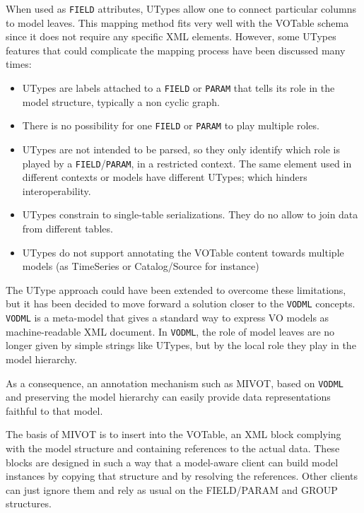 When used as \texttt{FIELD} attributes, UTypes allow one to connect particular columns to model leaves. This mapping method fits very well with the VOTable schema since it does not require any specific XML elements. 
However, some UTypes features that could complicate the mapping process have been discussed many times:

\begin{itemize}
  \item UTypes are labels attached to  a \texttt{FIELD} or \texttt{PARAM} that tells its role in the 
  model structure, typically a non cyclic graph. 
   \item There is no possibility for one  \texttt{FIELD} or \texttt{PARAM} to play multiple roles.
  \item UTypes are not intended to be parsed, so they only identify which role is played by a \texttt{FIELD}/\texttt{PARAM}, in a restricted context. The same element used in different contexts or models have different UTypes; which hinders interoperability.
  \item UTypes constrain to single-table serializations. They do no allow to join data from different tables. 
  \item UTypes do not support annotating the VOTable content towards multiple models 
  (as TimeSeries or Catalog/Source for instance)
\end{itemize}

The UType approach could have been extended to overcome these limitations, but it has been decided to move forward a solution closer to the \texttt{VODML} \citep{2018ivoa.spec.0910L} concepts. 
\texttt{VODML} is a meta-model that gives a standard way to express VO models as machine-readable XML document.
In \texttt{VODML}, the role of model leaves are no longer given by simple strings like UTypes, but by the local role they play in the model hierarchy.




As a consequence, an annotation mechanism such as MIVOT, based on \texttt{VODML} and preserving the model hierarchy can easily provide data representations faithful to that model.

The basis of MIVOT is to insert into the VOTable, an XML block complying with the 
model structure and containing references to the actual data.
These blocks are designed in such a way that a model-aware client can build  model instances by copying that structure and by resolving the references. 
Other clients can just ignore them and rely as usual on the FIELD/PARAM and GROUP structures.


